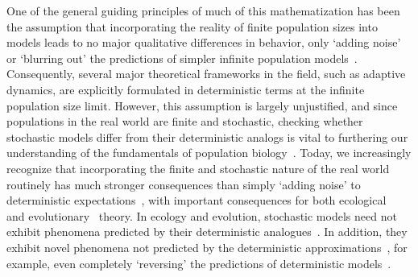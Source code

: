 One of the general guiding principles of much of this mathematization has been the assumption that incorporating the reality of finite population sizes into models leads to no major qualitative differences in behavior, only `adding noise' or `blurring out' the predictions of simpler infinite population models~\citep{page_unifying_2002}. Consequently, several major theoretical frameworks in the field, such as adaptive dynamics, are explicitly formulated in deterministic terms at the infinite population size limit. However, this assumption is largely unjustified, and since populations in the real world are finite and stochastic, checking whether stochastic models differ from their deterministic analogs is vital to furthering our understanding of the fundamentals of population biology~\citep{hastings_transients_2004, coulson_skeletons_2004, shoemaker_integrating_2020}. Today, we increasingly recognize that incorporating the finite and stochastic nature of the real world routinely has much stronger consequences than simply `adding noise' to deterministic expectations~\citep{boettiger_noise_2018}, with important consequences for both ecological~\citep{schreiber_does_2022} and evolutionary~\citep{delong_stochasticity_2023} theory. In ecology and evolution, stochastic models need not exhibit phenomena predicted by their deterministic analogues~\citep{proulx_what_2005, johansson_will_2006, claessen_delayed_2007,  wakano_evolutionary_2013, debarre_evolutionary_2016, johnson_two-dimensional_2021}. In addition, they exhibit novel phenomena not predicted by the deterministic approximations~\citep{rogers_demographic_2012, rogers_spontaneous_2012, rogers_modes_2015, veller_drift-induced_2017, delong_stochasticity_2023}, for example, even completely `reversing' the predictions of deterministic models~\citep{houchmandzadeh_selection_2012,houchmandzadeh_fluctuation_2015,constable_demographic_2016,mcleod_social_2019}.

